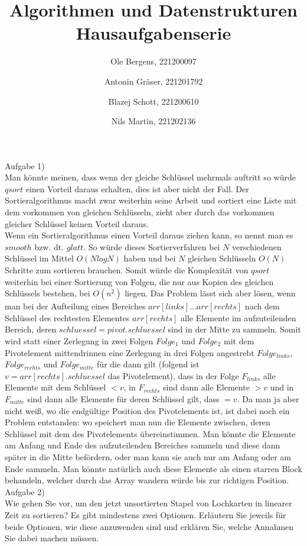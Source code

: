 \documentclass{article}
\title{Algorithmen und Datenstrukturen Hausaufgabenserie}
\author{
    \small Ole Bergens, 221200097\and
    \small Antonin Gräser, 221201792\and
    \small Blazej Schott, 221200610\and
    \small Nils Martin, 221202136
}
\begin{document}
    \maketitle\noindent
    Aufgabe 1)\\
    Man könnte meinen, dass wenn der gleiche Schlüssel mehrmals auftritt so würde $qsort$ einen Vorteil daraus erhalten, dies ist aber nicht der Fall. Der Sortieralgorithmus macht zwar weiterhin seine Arbeit und sortiert eine Liste mit dem vorkommen von gleichen Schlüsseln, zieht aber durch das vorkommen gleicher Schlüssel keinen Vorteil daraus.\\
    Wenn ein Sortieralgorithmus einen Vorteil daraus ziehen kann, so nennt man es $smooth$ bzw. dt. $glatt$. So würde dieses Sortierverfahren bei $N$ verschiedenen Schlüssel im Mittel $O(NlogN)$ haben und bei $N$ gleichen Schlüsseln $O(N)$ Schritte zum sortieren brauchen. Somit würde die Komplexität von $qsort$ weiterhin bei einer Sortierung von Folgen, die nur aus Kopien des gleichen Schlüssels bestehen, bei $O(n^2)$ liegen. Das Problem lässt sich aber lösen, wenn man bei der Aufteilung eines Bereiches $arr[links]...arr[rechts]$ nach dem Schlüssel des rechtesten Elementes $arr[rechts]$ alle Elemente im aufzuteilenden Bereich, deren $schluessel=pivot.schluessel$ sind in der Mitte zu sammeln. Somit wird statt einer Zerlegung in zwei Folgen $Folge_1$ und $Folge_2$ mit dem Pivotelement mittendrinnen eine Zerlegung in drei Folgen angestrebt $Folge_{links}$, $Folge_{rechts}$ und $Folge_{mitte}$ für die dann gilt (folgend ist $v=arr[rechts].schluessel$ das Pivotelement), dass in der Folge $F_{links}$ alle Elemente mit dem Schlüssel $<v$, in $F_{rechts}$ sind dann alle Elemente $>v$ und in $F_{mitte}$ sind dann alle Elemente für deren Schlüssel gilt, dass $=v$. Da man ja aber nicht weiß, wo die endgültige Position des Pivotelements ist, ist dabei noch ein Problem entstanden: wo speichert man nun die Elemente zwischen, deren Schlüssel mit dem des Pivotelements übereinstimmen. Man könnte die Elemente am Anfang und Ende des aufzuteilenden Bereiches sammeln und diese dann später in die Mitte befördern, oder man kann sie auch nur am Anfang oder am Ende sammeln. Man könnte natürlich auch diese Elemente als einen starren Block behandeln, welcher durch das Array wandern würde bis zur richtigen Position.
    \newpage\noindent
    Aufgabe 2)\\
    [...] Wie gehen Sie vor, um den jetzt unsortierten Stapel von Lochkarten in linearer Zeit zu sortieren? Es gibt mindestens zwei Optionen. Erläutern Sie jeweils für beide Optionen, wie diese anzuwenden sind und erklären Sie, welche Annahmen Sie dabei machen müssen.\\
\end{document}
